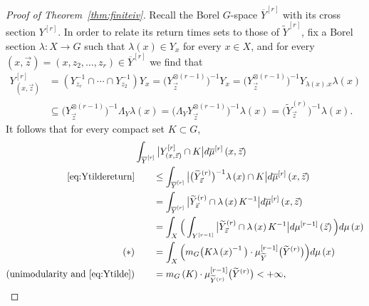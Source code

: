 \documentclass{amsart}
\numberwithin{equation}{subsection}
\theoremstyle{remark}
\begin{document}
\begin{proof}[Proof of Theorem~\ref{thm:finiteiv}]
Recall the Borel \(G\)-space \(\overline{Y}^{\left[r\right]}\) with its cross section \(Y^{\left[r\right]}\). In order to relate its return times sets to those of \(\widetilde{Y}^{\left[r\right]}\), fix a Borel section \(\lambda:X\to G\) such that \(\lambda\left(x\right)\in Y_{x}\) for every \(x\in X\), and for every \(\left(x,\vec{z}\right)=\left(x,z_{2},\dotsc,z_{r}\right)\in\overline{Y}^{\left[r\right]}\) we find that
\begin{equation}\label{eq:Ytildereturn}
\begin{aligned}
Y_{\left(x,\vec{z}\right)}^{\left[r\right]}	
&=\left(Y_{z_{r}}^{-1}\cap\dotsm\cap Y_{z_{2}}^{-1}\right)Y_{x}=\big(Y_{\vec{z}}^{\otimes\left(r-1\right)}\big)^{-1}Y_{x}=\big(Y_{\vec{z}}^{\otimes\left(r-1\right)}\big)^{-1}Y_{\lambda\left(x\right).x}\lambda\left(x\right)\\
&\subseteq\big(Y_{\vec{z}}^{\otimes\left(r-1\right)}\big)^{-1}\Lambda_{Y}\lambda\left(x\right)=\big(\Lambda_{Y}Y_{\vec{z}}^{\otimes\left(r-1\right)}\big)^{-1}\lambda\left(x\right)=\big(\widetilde{Y}_{\vec{z}}^{\left(r\right)}\big)^{-1}\lambda\left(x\right).
\end{aligned}
\end{equation}
It follows that for every compact set \(K\subset G\),
\begin{align*}
&\int_{\overline{Y}^{\left[r\right]}}\big|Y_{\left(x,\vec{z}\right)}^{\left[r\right]}\cap K\big|d\overline{\mu}^{\left[r\right]}\left(x,\vec{z}\right)\\
\eqref{eq:Ytildereturn}&\qquad \leq\int_{\overline{Y}^{\left[r\right]}}\big|\big(\widetilde{Y}_{\vec{z}}^{\left(r\right)}\big)^{-1}\lambda\left(x\right)\cap K\big|d\overline{\mu}^{\left[r\right]}\left(x,\vec{z}\right)\\
&\qquad=\int_{\overline{Y}^{\left[r\right]}}\big|\widetilde{Y}_{\vec{z}}^{\left(r\right)}\cap\lambda\left(x\right)K^{-1}\big|d\overline{\mu}^{\left[r\right]}\left(x,\vec{z}\right)\\
&\qquad=\int_{X}\Big(\int_{Y^{\left[r-1\right]}}\big|\widetilde{Y}_{\vec{z}}^{\left(r\right)}\cap\lambda\left(x\right)K^{-1}\big|d\mu^{\left[r-1\right]}\left(\vec{z}\right)\Big)d\mu\left(x\right)\\
\left(\ast\right)&\qquad=\int_{X}\Big(m_{G}\big(K\lambda\left(x\right)^{-1}\big)\cdot\mu_{\widetilde{Y}}^{\left[r-1\right]}\big(\widetilde{Y}^{\left(r\right)}\big)\Big)d\mu\left(x\right)\\
\text{(unimodularity and }\eqref{eq:Ytilde})&\qquad=m_{G}\left(K\right)\cdot\mu_{\widetilde{Y}^{\left(r\right)}}^{\left[r-1\right]}\big(\widetilde{Y}^{\left(r\right)}\big)<+\infty,

\end{align*}
\end{proof}
\end{document}

